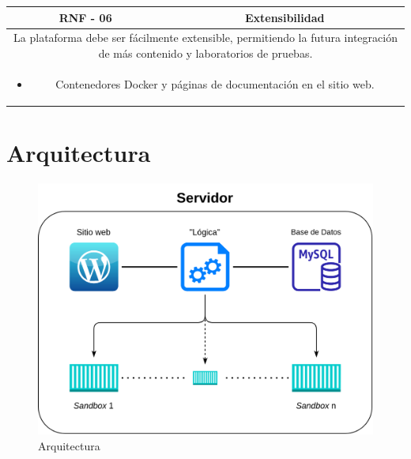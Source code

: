             \begin{table}[H]
                \centering
                \begin{tabular}{|c|c|}
                    \hline
                    \textbf{RNF - 06} & \textbf{Extensibilidad} \\
                    \hline
                    \multicolumn{2}{|p{15cm}|}{
                        La plataforma debe ser fácilmente extensible, permitiendo la futura integración de más contenido y laboratorios de pruebas.
                    } \\
                    \hline
                    \multicolumn{2}{|p{15cm}|}{
                        \begin{itemize}
                            \item Contenedores Docker y páginas de documentación en el sitio web.
                        \end{itemize}
                        } \\
                    \hline
                \end{tabular}
                \label{tab:RNF6}
            \end{table}
            
            \cleardoublepage
    
    
    \section{Arquitectura}
        \label{sec:arquitectura}
        
        \begin{figure}[h]
            \centering
            \includegraphics[scale=0.20]{images/Diagramas/Arquitectura.png}
            \caption{Arquitectura}
            \label{fig:arquitectura}
        \end{figure}

